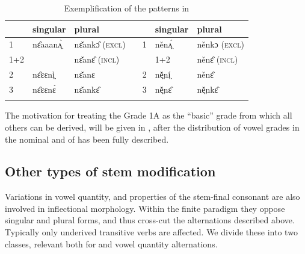 \documentclass[output=paper,newtxmath,modfonts,nonflat]{langsci/langscibook}
\begin{document}
 
\begin{table}
\begin{tabularx}{\textwidth}{lXlXlXl}
\lsptoprule
 & singular & plural &  &  & singular & plural\\
\midrule
 1 & nɛ̂aaanʌ̤̀ & nɛ̌ankɔ̂ (\textsc{excl}) &  & 1 & něnʌ̤́ & něnkɔ (\textsc{excl})\\
 1+2  &        & nɛ̌anɛ̂ (\textsc{incl}) & & & 1+2 & něnɛ̂ (\textsc{incl})\\
 2 & nɛ̂ɛɛnì̤ & nɛ̌anɛ &  & 2 & ně̤ní̤ & něnɛ̂\\
 3 & nɛ̂ɛɛnɛ̀ & nɛ̌ankɛ̂ &  & 3 & ně̤nɛ̂ & ně̤nkɛ̂\\
\lspbottomrule
\end{tabularx}
\caption{Exemplification of the patterns in }
\label{tab:monich:6}
\end{table}

The motivation for treating the Grade 1A as the “basic” grade from which all others can be derived, will be given in , after the distribution of vowel grades in the nominal and  of  has been fully described.

\subsection{Other types of stem modification} %
\label{sec:monich:3.3}

Variations in vowel quantity,  and properties of the stem-final consonant are also involved in inflectional morphology. Within the finite paradigm they oppose singular and plural forms, and thus cross-cut the  alternations described above. Typically only underived transitive verbs are affected. We divide these into two classes, relevant both for  and vowel quantity alternations. 
\end{document}
